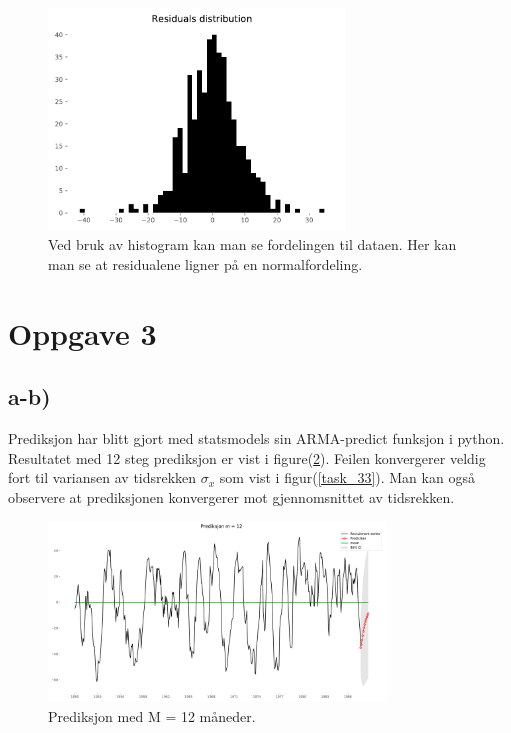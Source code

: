     \begin{figure}[hbt!]
        {\centering
            \includegraphics[width=0.70\textwidth]{task_2ahist.pdf}
            \caption{Ved bruk av histogram kan man se fordelingen til dataen. Her kan man se at residualene ligner på en normalfordeling.}
            \label{task_2ahist}
        \par}
        \end{figure}

\section{Oppgave 3}
\subsection{a-b)}

Prediksjon har blitt gjort med statsmodels sin ARMA-predict funksjon i python. Resultatet med 12 steg prediksjon er vist i figure(\ref{task_3}). Feilen konvergerer veldig fort til variansen av tidsrekken $\sigma_{x}$ som vist i figur(\ref{task_33}). Man kan også observere at prediksjonen konvergerer mot gjennomsnittet av tidsrekken.


\begin{figure}[hbt!]
    {\centering
        \includegraphics[width=0.80\textwidth]{task_33.pdf}
        \caption{Prediksjon med M = 12 måneder.}
        \label{task_3}
    \par}
    \end{figure}

